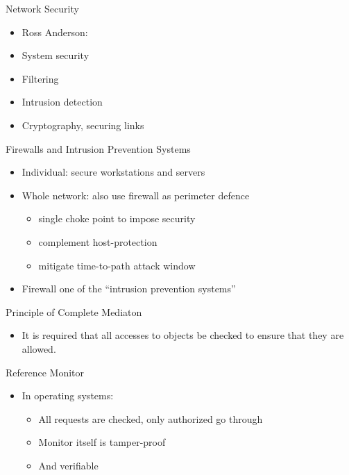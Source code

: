 \documentclass{beamer}
\begin{document}
\begin{frame}{Network Security}
  \begin{itemize}
  \item Ross Anderson: 
  \item System security 
  \item Filtering 
  \item Intrusion detection 
  \item Cryptography, securing links 
  \end{itemize}
\end{frame}

\begin{frame}{Firewalls and Intrusion Prevention Systems}
  \begin{itemize}
  \item Individual: secure workstations and servers 
  \item Whole network: also use firewall as perimeter 
    defence 
    \begin{itemize}
    \item single choke point to impose security
    \item complement host-protection
    \item mitigate time-to-path attack window
    \end{itemize}
  \item Firewall one of the ``intrusion prevention systems''
  \end{itemize}
\end{frame}

\begin{frame}{Principle of Complete Mediaton}
  \begin{itemize}
    \item It is required that all accesses to objects be checked 
to ensure that they are allowed.
  \end{itemize}
\end{frame}

\begin{frame}{Reference Monitor}
  \begin{itemize}
  \item In operating systems: 
    \begin{itemize}
    \item All requests are checked, only authorized go 
      through 
    \item Monitor itself is tamper-proof 
    \item And verifiable 
    \end{itemize}
  \end{itemize}
\end{frame}
\end{document}
